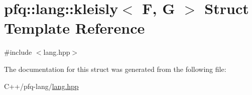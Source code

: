 \hypertarget{structpfq_1_1lang_1_1kleisly}{\section{pfq\+:\+:lang\+:\+:kleisly$<$ F, G $>$ Struct Template Reference}
\label{structpfq_1_1lang_1_1kleisly}
}


{\ttfamily \#include $<$lang.\+hpp$>$}



The documentation for this struct was generated from the following file\+:\begin{DoxyCompactItemize}
\item 
C++/pfq-\/lang/\hyperlink{lang_8hpp}{lang.\+hpp}\end{DoxyCompactItemize}
